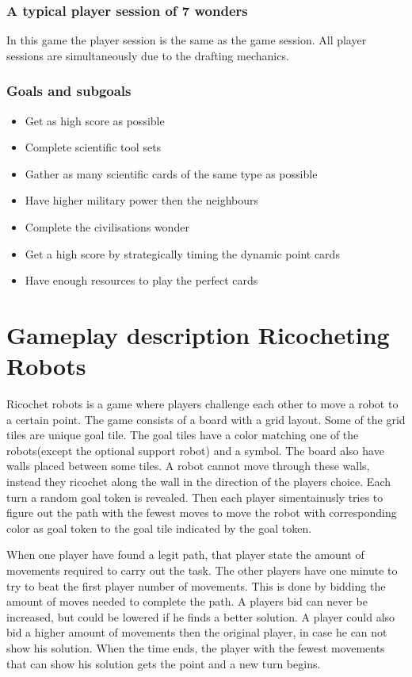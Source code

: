 \documentclass[a4paper]{article}
\begin{document}
\subsubsection{A typical player session of 7 wonders}
In this game the player session is the same as the game session. All player sessions are simultaneously due to the drafting mechanics.

\subsubsection{Goals and subgoals}
\begin{itemize}[noitemsep,topsep=0pt,parsep=0pt,partopsep=0pt]
  \item Get as high score as possible
  \item Complete scientific tool sets
  \item Gather as many scientific cards of the same type as possible
  \item Have higher military power then the neighbours
  \item Complete the civilisations wonder
  \item Get a high score by strategically timing the dynamic point cards
  \item Have enough resources to play the perfect cards
\end{itemize}
\section{Gameplay description Ricocheting Robots}
Ricochet robots is a game where players challenge each other to move a robot to a certain point.
The game consists of a board with a grid layout. Some of the grid tiles are unique goal tile.
The goal tiles have a color matching one of the robots(except the optional support robot) and a symbol.
The board also have walls placed between some tiles. A robot cannot move through these walls, instead they ricochet along the wall in the direction of the players choice.
Each turn a random goal token is revealed.
Then each player simentainusly tries to figure out the path with the fewest moves to move the robot with corresponding color as goal token to the goal tile indicated by the goal token. 

When one player have found a legit path, that player state the amount of movements required to carry out the task.
The other players have one minute to try to beat the first player number of movements. This is done by bidding the amount of moves needed to complete the path. A players bid can never be increased, but could be lowered if he finds a better solution. A player could also bid a higher amount of movements then the original player, in case he can not show his solution.
When the time ends, the player with the fewest movements that can show his solution gets the point and a new turn begins.
\end{document}
